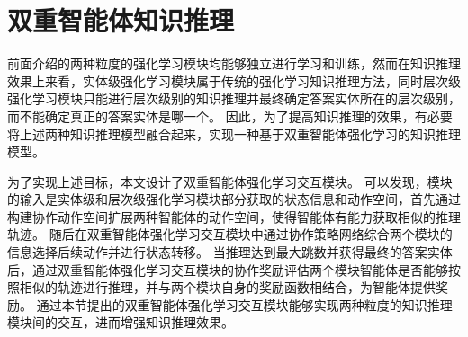 \documentclass[algorithmlist, AutoFakeBold, AutoFakeSlant, figurelist, tablelist, nomlist, engineering]{seuthesix}
\begin{document}
\section{双重智能体知识推理}
前面介绍的两种粒度的强化学习模块均能够独立进行学习和训练，然而在知识推理效果上来看，实体级强化学习模块属于传统的强化学习知识推理方法，同时层次级强化学习模块只能进行层次级别的知识推理并最终确定答案实体所在的层次级别，而不能确定真正的答案实体是哪一个。
因此，为了提高知识推理的效果，有必要将上述两种知识推理模型融合起来，实现一种基于双重智能体强化学习的知识推理模型。

为了实现上述目标，本文设计了双重智能体强化学习交互模块。
可以发现，模块的输入是实体级和层次级强化学习模块部分获取的状态信息和动作空间，首先通过构建协作动作空间扩展两种智能体的动作空间，使得智能体有能力获取相似的推理轨迹。
随后在双重智能体强化学习交互模块中通过协作策略网络综合两个模块的信息选择后续动作并进行状态转移。
当推理达到最大跳数并获得最终的答案实体后，通过双重智能体强化学习交互模块的协作奖励评估两个模块智能体是否能够按照相似的轨迹进行推理，并与两个模块自身的奖励函数相结合，为智能体提供奖励。
通过本节提出的双重智能体强化学习交互模块能够实现两种粒度的知识推理模块间的交互，进而增强知识推理效果。
\end{document}
